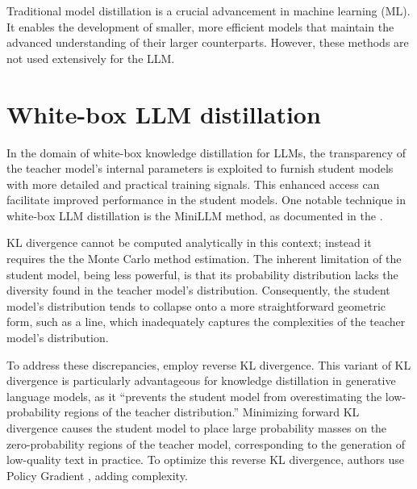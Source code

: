 
Traditional model distillation is a crucial advancement in machine learning (ML). It enables the development of smaller, more efficient models that maintain the advanced understanding of their larger counterparts. However, these methods are not used extensively for the LLM\@.

\section{White-box LLM distillation}
\label{section:whitebox}

In the domain of white-box knowledge distillation for LLMs, the transparency of the teacher model's internal parameters is exploited to furnish student models with more detailed and practical training signals. This enhanced access can facilitate improved performance in the student models. One notable technique in white-box LLM distillation is the MiniLLM method, as documented in the \cite{minillm}.

KL divergence cannot be computed analytically in this context; instead it requires the the Monte Carlo method \cite{montecarlo} estimation. The inherent limitation of the student model, being less powerful, is that its probability distribution lacks the diversity found in the teacher model's distribution. Consequently, the student model's distribution tends to collapse onto a more straightforward geometric form, such as a line, which inadequately captures the complexities of the teacher model's distribution.

To address these discrepancies, \citeauthor{minillm} \cite{minillm} employ reverse KL divergence. This variant of KL divergence is particularly advantageous for knowledge distillation in generative language models, as it ``prevents the student model from overestimating the low-probability regions of the teacher distribution.'' Minimizing forward KL divergence causes the student model to place large probability masses on the zero-probability regions of the teacher model, corresponding to the generation of low-quality text in practice. To optimize this reverse KL divergence, authors use Policy Gradient \cite{policy_gradient}, adding complexity.

